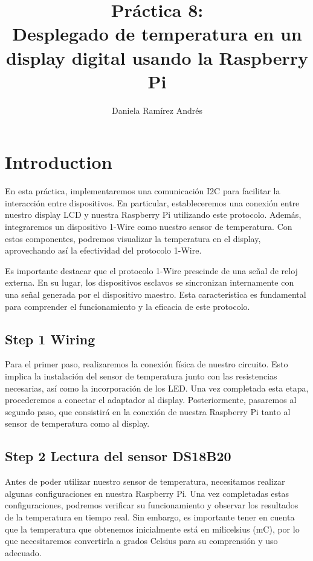 \documentclass[letterpaper,12pt]{article}
\title{Práctica 8: \\ Desplegado de temperatura en un display digital usando la Raspberry Pi}
\author{Daniela Ramírez Andrés}
\date{}
\begin{document}
	\twocolumn
	\maketitle
	\vspace{-6\baselineskip} %
	\section{Introduction}
	
	
	
	En esta práctica, implementaremos una comunicación I2C para facilitar la interacción entre dispositivos. En particular, estableceremos una conexión entre nuestro display LCD y nuestra Raspberry Pi utilizando este protocolo. Además, integraremos un dispositivo 1-Wire como nuestro sensor de temperatura. Con estos componentes, podremos visualizar la temperatura en el display, aprovechando así la efectividad del protocolo 1-Wire.
	
	Es importante destacar que el protocolo 1-Wire prescinde de una señal de reloj externa. En su lugar, los dispositivos esclavos se sincronizan internamente con una señal generada por el dispositivo maestro. Esta característica es fundamental para comprender el funcionamiento y la eficacia de este protocolo. \cite{agnihotri2023}
	
	
	\subsection{Step 1 Wiring}
	
	
	Para el primer paso, realizaremos la conexión física de nuestro circuito. Esto implica la instalación del sensor de temperatura junto con las resistencias necesarias, así como la incorporación de los LED. Una vez completada esta etapa, procederemos a conectar el adaptador al display. Posteriormente, pasaremos al segundo paso, que consistirá en la conexión de nuestra Raspberry Pi tanto al sensor de temperatura como al display.
	
	\subsection{Step 2 Lectura del sensor DS18B20 }
	

	Antes de poder utilizar nuestro sensor de temperatura, necesitamos realizar algunas configuraciones en nuestra Raspberry Pi. Una vez completadas estas configuraciones, podremos verificar su funcionamiento y observar los resultados de la temperatura en tiempo real. Sin embargo, es importante tener en cuenta que la temperatura que obtenemos inicialmente está en milicelsius (mC), por lo que necesitaremos convertirla a grados Celsius para su comprensión y uso adecuado. 
	
\end{document}
